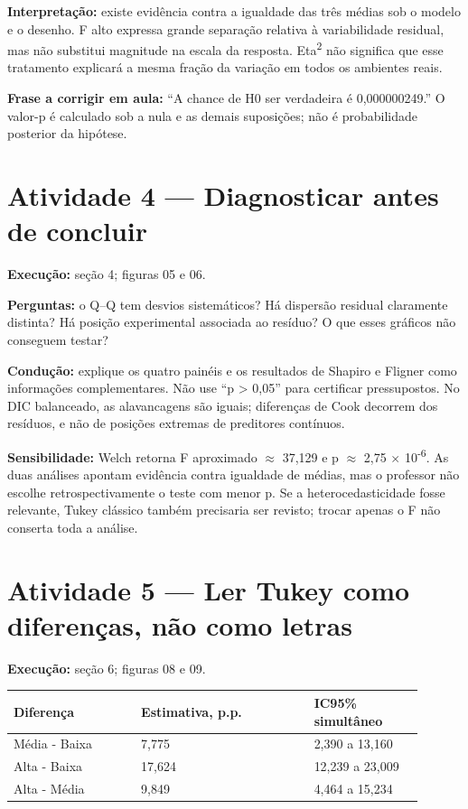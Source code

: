 \textbf{Interpretação:} existe evidência contra a igualdade das três médias sob o modelo e o desenho. F alto expressa grande separação relativa à variabilidade residual, mas não substitui magnitude na escala da resposta. Eta\textsuperscript{2} não significa que esse tratamento explicará a mesma fração da variação em todos os ambientes reais.

\textbf{Frase a corrigir em aula:} “A chance de H0 ser verdadeira é 0,000000249.” O valor-p é calculado sob a nula e as demais suposições; não é probabilidade posterior da hipótese.

\section{Atividade 4 --- Diagnosticar antes de concluir}

\textbf{Execução:} seção 4; figuras 05 e 06.

\textbf{Perguntas:} o Q--Q tem desvios sistemáticos? Há dispersão residual claramente distinta? Há posição experimental associada ao resíduo? O que esses gráficos não conseguem testar?

\textbf{Condução:} explique os quatro painéis e os resultados de Shapiro e Fligner como informações complementares. Não use “p > 0,05” para certificar pressupostos. No DIC balanceado, as alavancagens são iguais; diferenças de Cook decorrem dos resíduos, e não de posições extremas de preditores contínuos.

\textbf{Sensibilidade:} Welch retorna F aproximado \ensuremath{\approx} 37,129 e p \ensuremath{\approx} 2,75 \ensuremath{\times} 10\textsuperscript{-}\textsuperscript{6}. As duas análises apontam evidência contra igualdade de médias, mas o professor não escolhe retrospectivamente o teste com menor p. Se a heterocedasticidade fosse relevante, Tukey clássico também precisaria ser revisto; trocar apenas o F não conserta toda a análise.

\section{Atividade 5 --- Ler Tukey como diferenças, não como letras}

\textbf{Execução:} seção 6; figuras 08 e 09.

\begin{table}[H]\centering\small
\begin{tabular}{p{0.28\linewidth}p{0.38\linewidth}p{0.24\linewidth}}
\toprule
Diferença & Estimativa, p.p. & IC95\% simultâneo\\
\midrule
Média - Baixa & 7,775 & 2,390 a 13,160\\
Alta - Baixa & 17,624 & 12,239 a 23,009\\
Alta - Média & 9,849 & 4,464 a 15,234\\
\bottomrule\end{tabular}\end{table}

